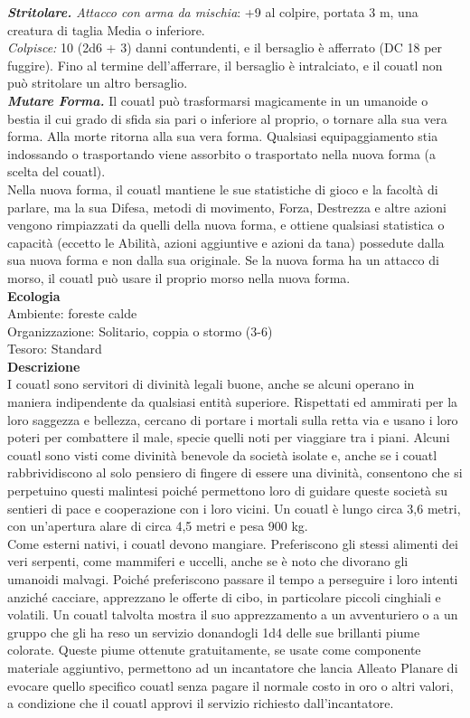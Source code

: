 \begin{multicols}{2}
\emph{\textbf{Stritolare.} Attacco con arma da mischia}: +9 al colpire, portata 3 m, una creatura di taglia Media o inferiore.\\
\emph{Colpisce:} 10 (2d6 + 3) danni contundenti, e il bersaglio è afferrato (DC  18 per fuggire). Fino al termine dell'afferrare, il bersaglio è intralciato, e il couatl non può stritolare un altro bersaglio.\\
\emph{\textbf{Mutare Forma.}} Il couatl può trasformarsi magicamente in un umanoide o bestia il cui grado di sfida sia pari o inferiore al proprio, o tornare alla sua vera forma. Alla morte ritorna alla sua vera forma. Qualsiasi equipaggiamento stia indossando o trasportando viene assorbito o trasportato nella nuova forma (a scelta del couatl).\\
Nella nuova forma, il couatl mantiene le sue statistiche di gioco e la facoltà di parlare, ma la sua Difesa, metodi di movimento, Forza, Destrezza e altre azioni vengono rimpiazzati da quelli della nuova forma, e ottiene qualsiasi statistica o capacità (eccetto le Abilità, azioni aggiuntive e azioni da tana) possedute dalla sua nuova forma e non dalla sua originale. Se la nuova forma ha un attacco di morso, il couatl può usare il proprio morso nella nuova forma.\\
\textbf{Ecologia}\\
Ambiente: foreste calde\\
Organizzazione: Solitario, coppia o stormo (3-6)\\
Tesoro: Standard\\
\textbf{Descrizione}\\
I couatl sono servitori di divinità legali buone, anche se alcuni operano in maniera indipendente da qualsiasi entità superiore. Rispettati ed ammirati per la loro saggezza e bellezza, cercano di portare i mortali sulla retta via e usano i loro poteri per combattere il male, specie quelli noti per viaggiare tra i piani. Alcuni couatl sono visti come divinità benevole da società isolate e, anche se i couatl rabbrividiscono al solo pensiero di fingere di essere una divinità, consentono che si perpetuino questi malintesi poiché permettono loro di guidare queste società su sentieri di pace e cooperazione con i loro vicini. Un couatl è lungo circa 3,6 metri, con un'apertura alare di circa 4,5 metri e pesa 900 kg.\\
Come esterni nativi, i couatl devono mangiare. Preferiscono gli stessi alimenti dei veri serpenti, come mammiferi e uccelli, anche se è noto che divorano gli umanoidi malvagi. Poiché preferiscono passare il tempo a perseguire i loro intenti anziché cacciare, apprezzano le offerte di cibo, in particolare piccoli cinghiali e volatili. Un couatl talvolta mostra il suo apprezzamento a un avventuriero o a un gruppo che gli ha reso un servizio donandogli 1d4 delle sue brillanti piume colorate. Queste piume ottenute gratuitamente, se usate come componente materiale aggiuntivo, permettono ad un incantatore che lancia Alleato Planare di evocare quello specifico couatl senza pagare il normale costo in oro o altri valori, a condizione che il couatl approvi il servizio richiesto dall'incantatore.\\


\end{multicols}
